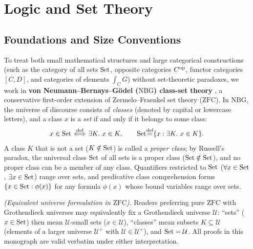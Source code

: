 \documentclass[10pt,a4paper]{article}
\begin{document}
\tableofcontents

\section{Logic and Set Theory}\label{sec:logic_set}

\subsection{Foundations and Size Conventions}\label{sec:foundations}
To treat both small mathematical structures and large categorical constructions (such as the category of all sets ${\textrm{Set}}$, opposite categories $C^{\textrm{op}}$, functor categories $[C, D]$, and categories of elements $\int_C G$) without set-theoretic paradoxes, we work in \textbf{von Neumann--Bernays--G\"odel ($\mathrm{NBG}$) class-set theory} \cite{Godel1940,Bernays1958,Mendelson2015,TakeutiZaring1982}, a conservative first-order extension of Zermelo--Fraenkel set theory ($\mathrm{ZFC}$). In $\mathrm{NBG}$, the universe of discourse consists of \emph{classes} (denoted by capital or lowercase letters), and a class $x$ is a \emph{set} if and only if it belongs to some class:
$$x \in {\textrm{Set}} {\stackrel{{\textrm{def}}}{\ \Longleftrightarrow\ }} \exists K.\ x \in K, \qquad {\textrm{Set}} {\stackrel{{\textrm{def}}}{=}} \{x : \exists K.\ x \in K\}.$$
A class $K$ that is not a set ($K \notin {\textrm{Set}}$) is called a \emph{proper class}; by Russell's paradox, the universal class ${\textrm{Set}}$ of all sets is a proper class (${\textrm{Set}} \notin {\textrm{Set}}$), and no proper class can be a member of any class. Quantifiers restricted to ${\textrm{Set}}$ ($\forall x \in {\textrm{Set}}$, $\exists x \in {\textrm{Set}}$) range over sets, and predicative class comprehension forms $\{x \in {\textrm{Set}} : \phi(x)\}$ for any formula $\phi(x)$ whose bound variables range over sets.

\emph{(Equivalent universe formulation in $\mathrm{ZFC}$).} Readers preferring pure $\mathrm{ZFC}$ with Grothendieck universes \cite{SGA4,MacLane1998,Borceux1994} may equivalently fix a Grothendieck universe $\mathcal{U}$: ``sets'' ($x \in {\textrm{Set}}$) then mean $\mathcal{U}$-small sets ($x \in \mathcal{U}$), ``classes'' mean subsets $K \subseteq \mathcal{U}$ (elements of a larger universe $\mathcal{U}^+$ with $\mathcal{U} \in \mathcal{U}^+$), and ${\textrm{Set}} = \mathcal{U}$. All proofs in this monograph are valid verbatim under either interpretation.
\end{document}
